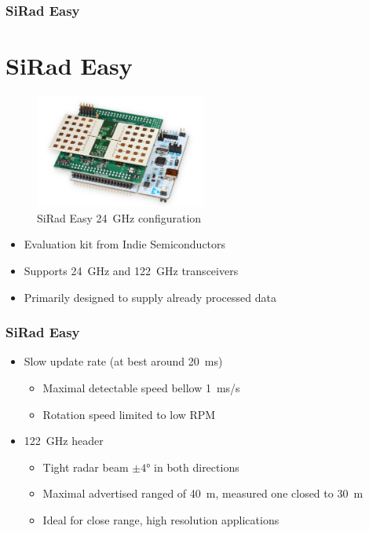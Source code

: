 \documentclass[aspectratio=43]{beamer}
\begin{document}
\begin{frame}[fragile]
  \frametitle{SiRad Easy}
  \section{SiRad Easy}

  \begin{figure}[h!]
    \centering
    \includegraphics[width=0.5\textwidth]{../img/sirad.png}

    \caption{SiRad Easy  24~GHz configuration }
    \label{fig:sirad}
  \end{figure}

  \begin{itemize}
    \item Evaluation kit from Indie Semiconductors
    \item Supports 24~GHz and 122~GHz transceivers
    \item Primarily designed to supply already processed data
  \end{itemize}
\end{frame}

\begin{frame}[fragile]
  \frametitle{SiRad Easy}

  \begin{itemize}
    \item Slow update rate (at best around 20~ms)
      \begin{itemize}
        \item Maximal detectable speed bellow 1~ms/s
        \item Rotation speed limited to low RPM
      \end{itemize}
    \item 122~GHz header
      \begin{itemize}
        \item Tight radar beam $\pm 4$° in both directions
        \item Maximal advertised ranged of 40~m, measured one closed to 30~m
        \item Ideal for close range, high resolution applications
      \end{itemize}
  \end{itemize}
\end{frame}
\end{document}
